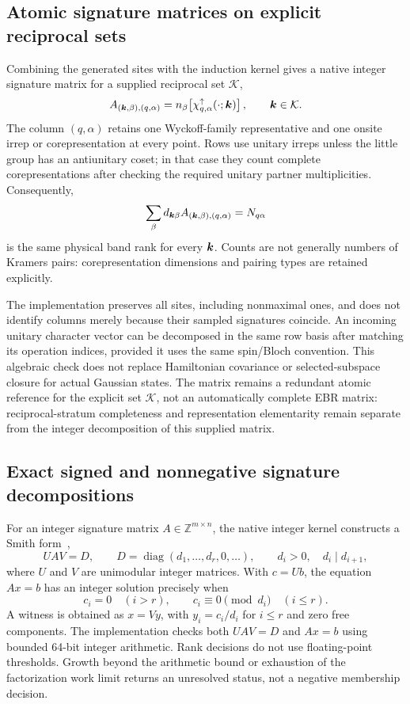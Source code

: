 \subsection{Atomic signature matrices on explicit reciprocal sets}
Combining the generated sites with the induction kernel gives a native
integer signature matrix for a supplied reciprocal set $\mathcal K$,
\begin{equation}
 A_{(\bm{k},\beta),(q,\alpha)}
 =n_{\beta}\!\left[\chi^{\uparrow}_{q,\alpha}(\cdot;\bm{k})\right],
 \qquad \bm{k}\in\mathcal K .
\end{equation}
The column $(q,\alpha)$ retains one Wyckoff-family representative and
one onsite irrep or corepresentation at every point. Rows use unitary
irreps unless the little group has an antiunitary coset; in that case
they count complete corepresentations after checking the required
unitary partner multiplicities. Consequently,
\begin{equation}
 \sum_\beta d_{\bm{k}\beta} A_{(\bm{k},\beta),(q,\alpha)}
 =N_{q\alpha}
\end{equation}
is the same physical band rank for every $\bm{k}$. Counts are not generally
numbers of Kramers pairs: corepresentation dimensions and pairing types
are retained explicitly.

The implementation preserves all sites, including nonmaximal ones,
and does not identify columns merely because their sampled signatures
coincide. An incoming unitary character vector can be decomposed in
the same row basis after matching its operation indices, provided it
uses the same spin/Bloch convention. This algebraic check does not replace
Hamiltonian covariance or selected-subspace closure for actual Gaussian
states. The matrix remains a redundant atomic reference for the
explicit set $\mathcal K$, not an automatically complete EBR matrix:
reciprocal-stratum completeness and representation elementarity remain
separate from the integer decomposition of this supplied matrix.

\subsection{Exact signed and nonnegative signature decompositions}
For an integer signature matrix $A\in\mathbb Z^{m\times n}$, the native
integer kernel constructs a Smith form~\cite{CanoBradlyn2021},
\begin{equation}
 UAV=D,\qquad
 D=\operatorname{diag}(d_1,\ldots,d_r,0,\ldots),\qquad
 d_i>0,\quad d_i\mid d_{i+1},
\end{equation}
where $U$ and $V$ are unimodular integer matrices. With $c=Ub$,
the equation $Ax=b$ has an integer solution precisely when
\begin{equation}
 c_i=0\quad(i>r),\qquad c_i\equiv0\pmod{d_i}\quad(i\leq r).
\end{equation}
A witness is obtained as $x=Vy$, with $y_i=c_i/d_i$ for $i\leq r$
and zero free components. The implementation checks both $UAV=D$
and $Ax=b$ using bounded 64-bit integer arithmetic. Rank decisions
do not use floating-point thresholds. Growth beyond the arithmetic
bound or exhaustion of the factorization work limit returns an
unresolved status, not a negative membership decision.

